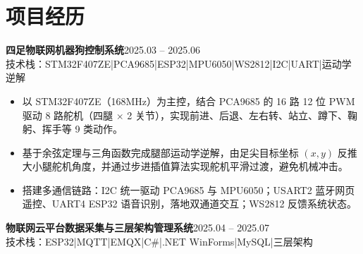 \documentclass[10pt,a4paper]{article}
\newcommand{\projectblock}[3]{%
    {\bfseries\color{darktext}#1}\hfill{\color{graytext}#2}\\%
    {\small\color{graytext}#3}%
    \vspace{0.2em}%
}
\begin{document}
\section{\faProjectDiagram\hspace{0.4em}项目经历}

\projectblock{四足物联网机器狗控制系统}{2025.03 -- 2025.06}{技术栈：STM32F407ZE\hspace{0.3em}|\hspace{0.3em}PCA9685\hspace{0.3em}|\hspace{0.3em}ESP32\hspace{0.3em}|\hspace{0.3em}MPU6050\hspace{0.3em}|\hspace{0.3em}WS2812\hspace{0.3em}|\hspace{0.3em}I2C\hspace{0.3em}|\hspace{0.3em}UART\hspace{0.3em}|\hspace{0.3em}运动学逆解}

\begin{itemize}[leftmargin=1.5em, itemsep=2pt, parsep=0pt, topsep=2pt]
    \item 以 STM32F407ZE（168MHz）为主控，结合 PCA9685 的 16 路 12 位 PWM 驱动 8 路舵机（四腿 $\times$ 2 关节），实现前进、后退、左右转、站立、蹲下、鞠躬、挥手等 9 类动作。
    \item 基于余弦定理与三角函数完成腿部运动学逆解，由足尖目标坐标 $(x, y)$ 反推大小腿舵机角度，并通过步进插值算法实现舵机平滑过渡，避免机械冲击。
    \item 搭建多通信链路：I2C 统一驱动 PCA9685 与 MPU6050；USART2 蓝牙网页遥控、UART4 ESP32 语音识别，落地双通道交互；WS2812 反馈系统状态。
\end{itemize}

\vspace{0.15em}

\projectblock{物联网云平台数据采集与三层架构管理系统}{2025.04 -- 2025.07}{技术栈：ESP32\hspace{0.3em}|\hspace{0.3em}MQTT\hspace{0.3em}|\hspace{0.3em}EMQX\hspace{0.3em}|\hspace{0.3em}C\#\hspace{0.3em}|\hspace{0.3em}.NET WinForms\hspace{0.3em}|\hspace{0.3em}MySQL\hspace{0.3em}|\hspace{0.3em}三层架构}
\end{document}
